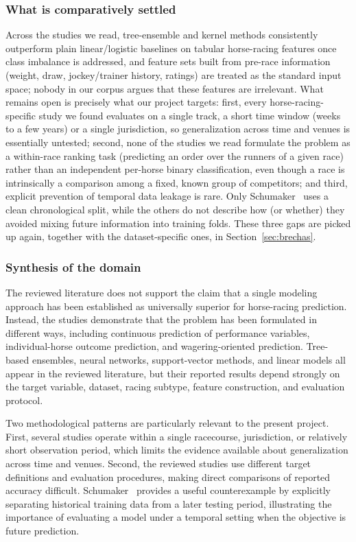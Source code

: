 \subsubsection*{\textbf{What is comparatively settled}} Across the studies we read, tree-ensemble
and kernel methods consistently outperform plain linear/logistic baselines on
tabular horse-racing features once class imbalance is addressed, and feature sets
built from pre-race information (weight, draw, jockey/trainer history, ratings)
are treated as the standard input space; nobody in our corpus argues that these
features are irrelevant. What remains open is precisely what our project
targets: first, every horse-racing-specific study we found evaluates on a single
track, a short time window (weeks to a few years) or a single jurisdiction, so
generalization across time and venues is essentially untested; second, none of the
studies we read formulate the problem as a within-race ranking task (predicting an
order over the runners of a given race) rather than an independent per-horse
binary classification, even though a race is intrinsically a comparison among a
fixed, known group of competitors; and third, explicit prevention of temporal data
leakage is rare. Only Schumaker~\cite{ejeA_schumaker2018} uses a clean
chronological split, while the others do not describe how (or whether) they
avoided mixing future information into training folds. These three gaps are
picked up again, together with the dataset-specific ones, in
Section~\ref{sec:brechas}.

\subsubsection*{\textbf{Synthesis of the domain}} The reviewed literature does not support the claim that a single modeling approach has been established as universally superior
for horse-racing prediction. Instead, the studies demonstrate that the problem has
been formulated in different ways, including continuous prediction of performance
variables, individual-horse outcome prediction, and wagering-oriented prediction.
Tree-based ensembles, neural networks, support-vector methods, and linear models
all appear in the reviewed literature, but their reported results depend strongly
on the target variable, dataset, racing subtype, feature construction, and
evaluation protocol.

Two methodological patterns are particularly relevant to the present project.
First, several studies operate within a single racecourse, jurisdiction, or
relatively short observation period, which limits the evidence available about
generalization across time and venues. Second, the reviewed studies use different
target definitions and evaluation procedures, making direct comparisons of reported
accuracy difficult. Schumaker~\cite{ejeA_schumaker2018} provides a useful
counterexample by explicitly separating historical training data from a later
testing period, illustrating the importance of evaluating a model under a temporal
setting when the objective is future prediction.

